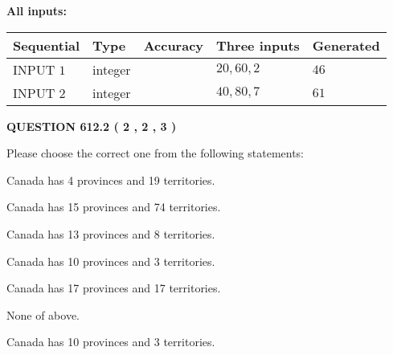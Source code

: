 \documentclass[12pt]{article}
\begin{document}
   
   
   
\noindent{}
   
   
   
   
\noindent\vspace{0.1in}\hspace{-0.08in} {\textbf{\Large{All inputs: }}}
   
   
  
  
\noindent\begin{tabular}{|l|l|l|l|l|}
\hline
 Sequential & Type & Accuracy & Three inputs & Generated \\ 
\hline
 
 
  INPUT $  1 $ & integer &  & $
 20
 , 
 60
 , 
 2
 $ & $ 46 $ 
 \\  \hline  
 
 
  INPUT $  2 $ & integer &  & $
 40
 , 
 80
 , 
 7
 $ & $ 61 $ 
 \\  \hline  
 \end{tabular}
   
   
  
\vspace{0.2in}
  
{\textbf{\Large{QUESTION
612.2 
 ( 2 , 2 , 3 )
}}}
  
  
Please choose the correct one from the following statements:
 
 
Canada has   4 provinces and  19 territories.
 
 
Canada has  15 provinces and  74 territories.
 
 
Canada has  13 provinces and  8 territories.
 
 
Canada has 10  provinces and 3 territories.
 
 
Canada has  17 provinces and  17 territories.
 
 
 None of above.
 
 
\noindent{}
 
 
Canada has 10  provinces and 3 territories.
 
 
\noindent{}
 
 
   
\end{document}
